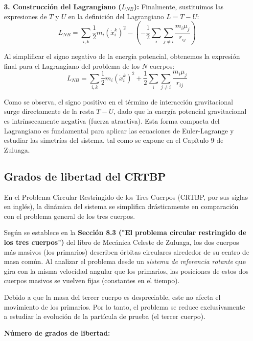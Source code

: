\documentclass[a4paper]{article}
\begin{document}
\textbf{3. Construcción del Lagrangiano ($L_{NB}$):}
Finalmente, sustituimos las expresiones de $T$ y $U$ en la definición del Lagrangiano $L = T - U$:
$$L_{NB} = \sum_{i,k} \frac{1}{2} m_i (\dot{x}^k_i)^2 - \left( - \frac{1}{2} \sum_i \sum_{j \neq i} \frac{m_i \mu_j}{r_{ij}} \right)$$

Al simplificar el signo negativo de la energía potencial, obtenemos la expresión final para el Lagrangiano del problema de los $N$ cuerpos:
$$L_{NB} = \sum_{i,k} \frac{1}{2} m_i (\dot{x}^k_i)^2 + \frac{1}{2} \sum_i \sum_{j \neq i} \frac{m_i \mu_j}{r_{ij}}$$

Como se observa, el signo positivo en el término de interacción gravitacional surge directamente de la resta $T - U$, dado que la energía potencial gravitacional es intrínsecamente negativa (fuerza atractiva). Esta forma compacta del Lagrangiano es fundamental para aplicar las ecuaciones de Euler-Lagrange y estudiar las simetrías del sistema, tal como se expone en el Capítulo 9 de Zuluaga.


\subsection{Grados de libertad del CRTBP}

En el Problema Circular Restringido de los Tres Cuerpos (CRTBP, por sus siglas en inglés), la dinámica del sistema se simplifica drásticamente en comparación con el problema general de los tres cuerpos. 

Según se establece en la \textbf{Sección 8.3 ("El problema circular restringido de los tres cuerpos")} del libro de Mecánica Celeste de Zuluaga, los dos cuerpos más masivos (los primarios) describen órbitas circulares alrededor de su centro de masa común. Al analizar el problema desde un \textit{sistema de referencia rotante} que gira con la misma velocidad angular que los primarios, las posiciones de estos dos cuerpos masivos se vuelven fijas (constantes en el tiempo).

Debido a que la masa del tercer cuerpo es despreciable, este no afecta el movimiento de los primarios. Por lo tanto, el problema se reduce exclusivamente a estudiar la evolución de la partícula de prueba (el tercer cuerpo).

\textbf{Número de grados de libertad:}
\end{document}

